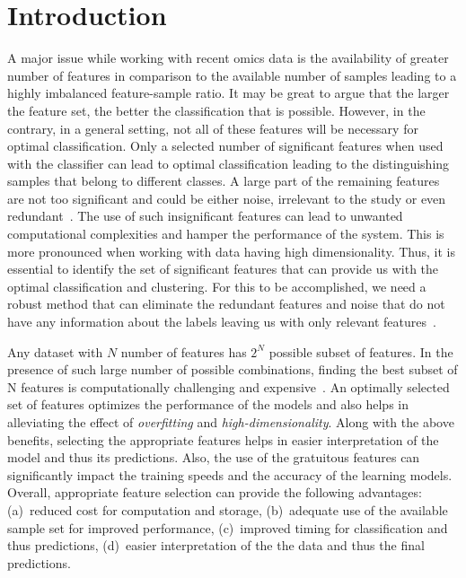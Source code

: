 \documentclass{bioinfo}
\begin{document}
\section{Introduction} \label{intro}

A major issue while working with recent omics data is the availability of greater number of features in comparison to the available number of samples leading to a highly imbalanced feature-sample ratio. 
It may be great to argue that the larger the feature set, the better the classification that is possible. 
However, in the contrary, in a general setting, not all of these features will be necessary for optimal classification. 
Only a selected number of significant features when used with the classifier can lead to optimal classification leading to the distinguishing samples that belong to different classes. 
A large part of the remaining features are not too significant and could be either noise, irrelevant to the study or even redundant~\citep{pirgazi2019efficient}. 
The use of such insignificant features can lead to unwanted computational complexities and hamper the performance of the system. 
This is more pronounced when working with data having high dimensionality. 
Thus, it is essential to identify the set of significant features that can provide us with the optimal classification and clustering. 
For this to be accomplished, we need a robust method that can eliminate the redundant features and noise that do not have any information about the labels leaving us with only relevant features~\citep{liu2012feature}. 

Any dataset with $N$ number of features has $2^N$ possible subset of features. 
In the presence of such large number of possible combinations, finding the best subset of N features is computationally challenging and expensive~\citep{liang2018review}.
An optimally selected set of features optimizes the performance of the models and also helps in alleviating the effect of \emph{overfitting} and \emph{high-dimensionality}. 
Along with the above benefits, selecting the appropriate features helps in easier interpretation of the model and thus its predictions. 
Also, the use of the gratuitous features can significantly impact the training speeds and the accuracy of the learning models. 
Overall, appropriate feature selection can provide the following advantages: (a)~reduced cost for computation and storage, (b)~adequate use of the available sample set for improved performance, (c)~improved timing for classification and thus predictions, (d)~easier interpretation of the the data and thus the final predictions.
\end{document}
